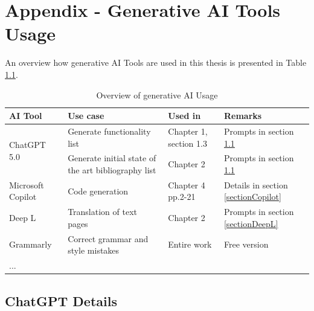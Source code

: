 \documentclass[12pt,a4paper]{book}
\theoremstyle{definition}
\theoremstyle{remark}
\begin{document}
\newpage
\normalsize{}

\tableofcontents












\appendix
\chapter{Appendix - Generative AI Tools Usage}
\label{genAIUsage}

An overview how  generative AI Tools are used in this thesis is presented in Table \ref{tab:genAIOverview}.

\begin{table}[h!]
    \centering
    \begin{tabularx}{\textwidth}{|l|X|X|X|}
            \hline \rowcolor{blue!20}
         AI Tool& Use case & Used in & Remarks \\\hline
         \multirow{2}{*}{ChatGPT 5.0} & Generate functionality list & Chapter 1, section 1.3& Prompts in section \ref{sectionGhatGPT}\\ \cline{2-4}
          
          & Generate initial state of the art bibliography list & Chapter 2 & Prompts in section \ref{sectionGhatGPT}\\ \hline
         
         Microsoft Copilot & Code generation & Chapter 4 pp.2-21  & Details in section \ref{sectionCopilot}\\ \hline
         Deep L &  Translation of text pages & Chapter 2 & Prompts in section \ref{sectionDeepL} \\ \hline
         Grammarly & Correct grammar and style mistakes & Entire work & Free version\\ \hline
         ... &  & & \\\hline
    \end{tabularx}
    \caption{Overview of generative AI Usage}
    \label{tab:genAIOverview}
\end{table}




    
\section{ChatGPT Details} 
\label{sectionGhatGPT}
\end{document}

